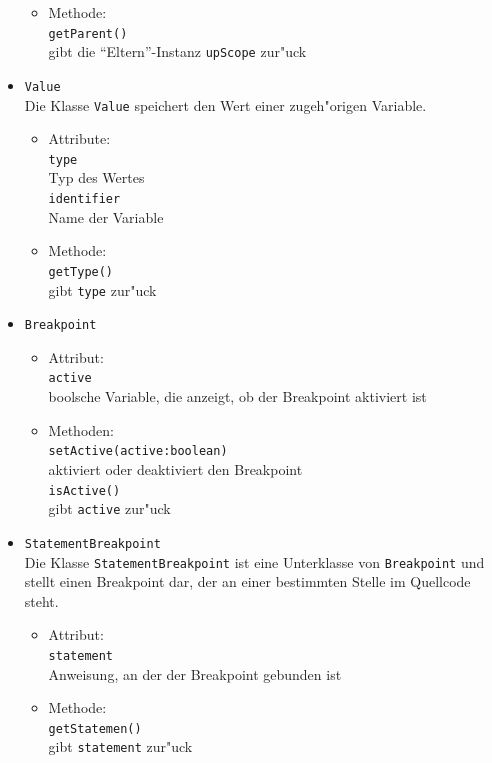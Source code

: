 \documentclass[10pt,a4paper,titlepage]{article}
\begin{document}
\begin{itemize}
\begin{itemize}
\item Methode: \\
\texttt{getParent()} \\
gibt die "`Eltern"'-Instanz \texttt{upScope} zur"uck
\end{itemize}
\item \texttt{Value} \\
Die Klasse \texttt{Value} speichert den Wert einer zugeh"origen Variable. 
\begin{itemize}
\item Attribute: \\
\texttt{type} \\
Typ des Wertes \\
\texttt{identifier} \\
Name der Variable 
\item Methode: \\
\texttt{getType()} \\
gibt \texttt{type} zur"uck 
\end{itemize}
\item \texttt{Breakpoint}
\begin{itemize}
\item Attribut: \\
\texttt{active} \\
boolsche Variable, die anzeigt, ob der Breakpoint aktiviert ist \\
\item Methoden: \\
\texttt{setActive(active:boolean)} \\
aktiviert oder deaktiviert den Breakpoint \\
\texttt{isActive()} \\
gibt \texttt{active} zur"uck
\end{itemize}
\item \texttt{StatementBreakpoint} \\
Die Klasse \texttt{StatementBreakpoint} ist eine Unterklasse von \texttt{Breakpoint} und stellt einen Breakpoint dar, der an einer bestimmten Stelle im Quellcode steht. 
\begin{itemize}
\item Attribut: \\
\texttt{statement} \\
Anweisung, an der der Breakpoint gebunden ist
\item Methode: \\
\texttt{getStatemen()} \\
gibt \texttt{statement} zur"uck
\end{itemize}

\end{itemize}
\end{document}

